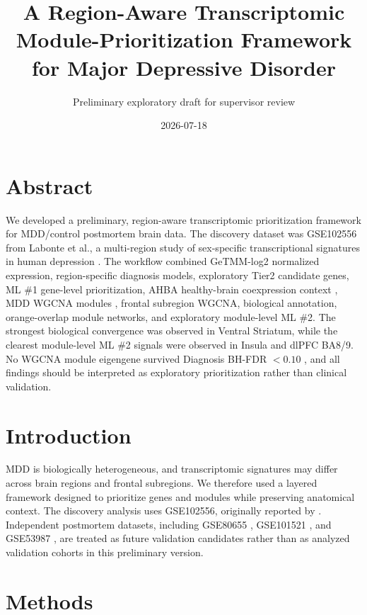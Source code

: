 \documentclass[11pt]{article}
\title{A Region-Aware Transcriptomic Module-Prioritization Framework for Major Depressive Disorder}
\author{Preliminary exploratory draft for supervisor review}
\date{2026-07-18}
\begin{document}
\maketitle

\section{Abstract}

We developed a preliminary, region-aware transcriptomic prioritization framework for MDD/control postmortem brain data. The discovery dataset was GSE102556 from Labonte et al., a multi-region study of sex-specific transcriptional signatures in human depression \citep{Labonte2017}. The workflow combined GeTMM-log2 normalized expression, region-specific diagnosis models, exploratory Tier2 candidate genes, ML \#1 gene-level prioritization, AHBA healthy-brain coexpression context \citep{Hawrylycz2015,Markello2021}, MDD WGCNA modules \citep{Langfelder2008}, frontal subregion WGCNA, biological annotation, orange-overlap module networks, and exploratory module-level ML \#2. The strongest biological convergence was observed in Ventral Striatum, while the clearest module-level ML \#2 signals were observed in Insula and dlPFC BA8/9. No WGCNA module eigengene survived Diagnosis BH-FDR $<0.10$ \citep{Benjamini1995}, and all findings should be interpreted as exploratory prioritization rather than clinical validation.

\section{Introduction}

MDD is biologically heterogeneous, and transcriptomic signatures may differ across brain regions and frontal subregions. We therefore used a layered framework designed to prioritize genes and modules while preserving anatomical context. The discovery analysis uses GSE102556, originally reported by \citet{Labonte2017}. Independent postmortem datasets, including GSE80655 \citep{Ramaker2017}, GSE101521 \citep{Pantazatos2017}, and GSE53987 \citep{Lanz2019}, are treated as future validation candidates rather than as analyzed validation cohorts in this preliminary version.

\section{Methods}
\end{document}
